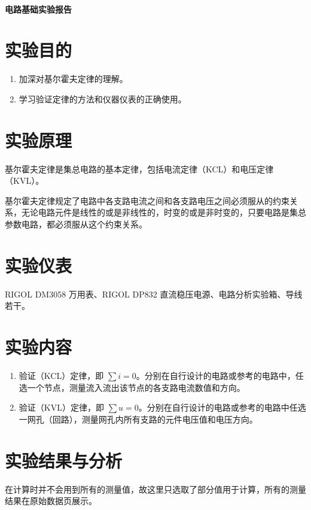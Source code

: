 \documentclass[a4paper,utf8]{article}
\begin{document}
\begin{center}
    {\mbox{}\\[7em]\bfseries\songti%
    电路基础实验报告}\\[34mm]
\end{center}
\newpage
\section{实验目的}
\begin{enumerate}
    \item 加深对基尔霍夫定律的理解。
    \item 学习验证定律的方法和仪器仪表的正确使用。
\end{enumerate}

\section{实验原理}%
    基尔霍夫定律是集总电路的基本定律，包括电流定律（KCL）和电压定律（KVL）。\par
    基尔霍夫定律规定了电路中各支路电流之间和各支路电压之间必须服从的约束关系，无论电路元件是线性的或是非线性的，时变的或是非时变的，只要电路是集总参数电路，都必须服从这个约束关系。

\section{实验仪表}
    RIGOL DM3058 万用表、RIGOL DP832 直流稳压电源、电路分析实验箱、导线若干。
\section{实验内容}
    \begin{enumerate}
        \item 验证（KCL）定律，即 $\sum i=0$。分别在自行设计的电路或参考的电路中，任选一个节点，测量流入流出该节点的各支路电流数值和方向。
        \item 验证（KVL）定律，即 $\sum u=0$。分别在自行设计的电路或参考的电路中任选一网孔（回路），测量网孔内所有支路的元件电压值和电压方向。
    \end{enumerate}
\section{实验结果与分析}
    在计算时并不会用到所有的测量值，故这里只选取了部分值用于计算，所有的测量结果在原始数据页展示。
\end{document}
